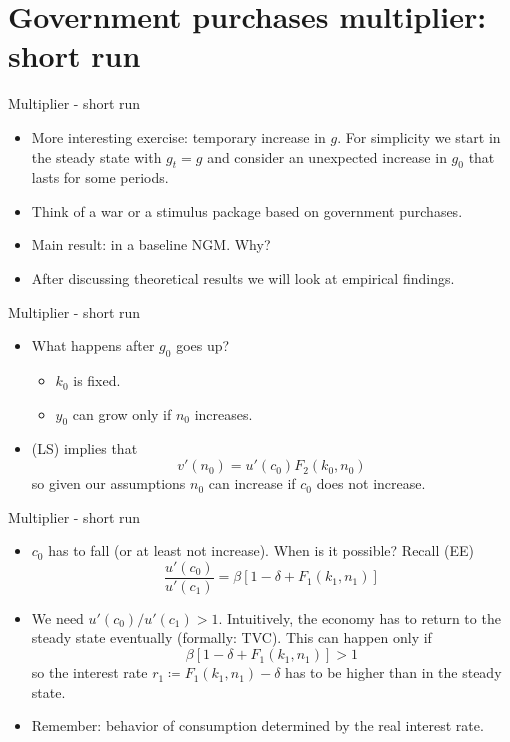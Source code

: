 \documentclass[11pt,xcolor={dvipsnames},aspectratio=159,hyperref={pdftex,pdfpagemode=UseNone,hidelinks,pdfdisplaydoctitle=true},usepdftitle=false]{beamer}
\begin{document}
        \section*{Government purchases multiplier: short run}
        \begin{frame}{Multiplier - short run}
        
        \begin{itemize}
        \item More interesting exercise: temporary increase in $g$. For simplicity
        we start in the steady state with $g_{t}=g$ and consider an unexpected
        increase in $g_{0}$ that lasts for some periods.
        \item Think of a war or a stimulus package based on government purchases.
        \item Main result:  in a baseline
        NGM. Why?
        \item After discussing theoretical results we will look at empirical findings.
        \end{itemize}
        \end{frame}
        \begin{frame}{Multiplier - short run}
        
        \begin{itemize}
        \item What happens after $g_{0}$ goes up? 
        \begin{itemize}
        \item $k_{0}$ is fixed.
        \item $y_{0}$ can grow only if $n_{0}$ increases.
        \end{itemize}
        \item (LS) implies that 
        \[
        v'\left(n_{0}\right)=u'\left(c_{0}\right)F_{2}\left(k_{0},n_{0}\right)\tag{LS}
        \]
        so given our assumptions $n_{0}$ can increase  if $c_{0}$
        does not increase. 
        \end{itemize}
        \end{frame}
        \begin{frame}{Multiplier - short run}
        \begin{itemize}
        \item $c_{0}$ has to fall (or at least not increase). When is it possible?
        Recall (EE)
        \[
        \frac{u'\left(c_{0}\right)}{u'\left(c_{1}\right)}=\beta\left[1-\delta+F_{1}\left(k_{1},n_{1}\right)\right]
        \]
        \item We need $u'\left(c_{0}\right)/u'\left(c_{1}\right)>1$. Intuitively,
        the economy has to return to the steady state eventually (formally:
        TVC). This can happen only if 
        \[
        \beta\left[1-\delta+F_{1}\left(k_{1},n_{1}\right)\right]>1
        \]
        so the interest rate $r_{1}\coloneqq F_{1}\left(k_{1},n_{1}\right)-\delta$
        has to be higher than in the steady state.
        \item Remember: behavior of consumption determined by the real interest rate. 
        \end{itemize}
        \end{frame}
\end{document}
